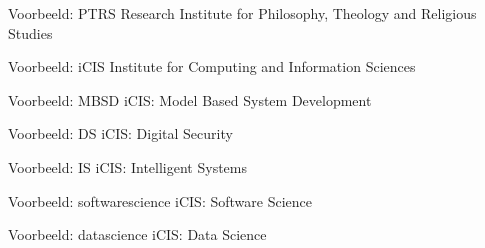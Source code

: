 \documentclass[department=softwarescience, notes={show notes}, slidesperpage=4, handout, official=true]{beamerruhuisstijl}
\begin{document}
\renewcommand{\dept}{ptrs}
\begin{frame}
    \titlepage
\end{frame}
\begin{frame}{Voorbeeld: PTRS}
	Research Institute for Philosophy, Theology and Religious Studies
\end{frame}

\renewcommand{\dept}{icis}
\begin{frame}
    \titlepage
\end{frame}
\begin{frame}{Voorbeeld: iCIS}
	Institute for Computing and Information Sciences
\end{frame}

\renewcommand{\dept}{mbsd}
\begin{frame}
    \titlepage
\end{frame}
\begin{frame}{Voorbeeld: MBSD}
	iCIS: Model Based System Development
\end{frame}

\renewcommand{\dept}{ds}
\begin{frame}
    \titlepage
\end{frame}
\begin{frame}{Voorbeeld: DS}
	iCIS: Digital Security
\end{frame}

\renewcommand{\dept}{is}
\begin{frame}
    \titlepage
\end{frame}
\begin{frame}{Voorbeeld: IS}
	iCIS: Intelligent Systems
\end{frame}

\renewcommand{\dept}{softwarescience}
\begin{frame}
    \titlepage
\end{frame}
\begin{frame}{Voorbeeld: softwarescience}
	iCIS: Software Science
\end{frame}

\renewcommand{\dept}{datascience}
\begin{frame}
    \titlepage
\end{frame}
\begin{frame}{Voorbeeld: datascience}
	iCIS: Data Science
\end{frame}
\end{document}
